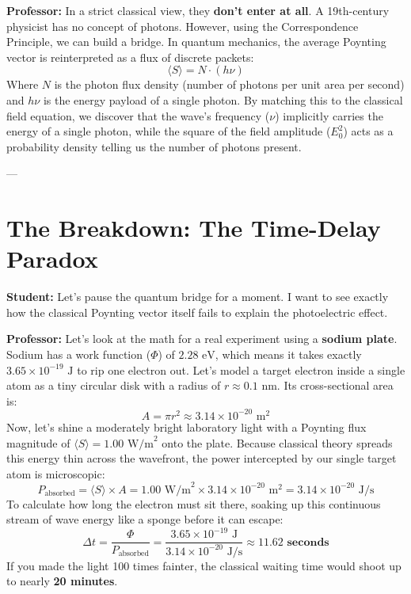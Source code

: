 \documentclass[11pt,a4paper]{article}
\newcommand{\Professor}{\noindent\textbf{\textcolor{profcolor}{Professor:}} }
\newcommand{\Student}{\noindent\textbf{\textcolor{studcolor}{Student:}} }
\begin{document}
	\Professor In a strict classical view, they \textbf{don't enter at all}. A 19th-century physicist has no concept of photons. However, using the Correspondence Principle, we can build a bridge. In quantum mechanics, the average Poynting vector is reinterpreted as a flux of discrete packets:
	\begin{equation}
		\langle S \rangle = N \cdot (h\nu)
	\end{equation}
	Where $N$ is the photon flux density (number of photons per unit area per second) and $h\nu$ is the energy payload of a single photon. By matching this to the classical field equation, we discover that the wave's frequency ($\nu$) implicitly carries the energy of a single photon, while the square of the field amplitude ($E_0^2$) acts as a probability density telling us the number of photons present.
	
	---
	
	\section{The Breakdown: The Time-Delay Paradox}
	
	\Student Let's pause the quantum bridge for a moment. I want to see exactly how the classical Poynting vector itself fails to explain the photoelectric effect. 
	
	\Professor Let's look at the math for a real experiment using a \textbf{sodium plate}. 
	Sodium has a work function ($\Phi$) of $2.28 \text{ eV}$, which means it takes exactly $3.65 \times 10^{-19} \text{ J}$ to rip one electron out. Let's model a target electron inside a single atom as a tiny circular disk with a radius of $r \approx 0.1 \text{ nm}$. Its cross-sectional area is:
	\begin{equation}
		A = \pi r^2 \approx 3.14 \times 10^{-20} \text{ m}^2
	\end{equation}
	Now, let's shine a moderately bright laboratory light with a Poynting flux magnitude of $\langle S \rangle = 1.00 \text{ W/m}^2$ onto the plate. Because classical theory spreads this energy thin across the wavefront, the power intercepted by our single target atom is microscopic:
	\begin{equation}
		P_{\text{absorbed}} = \langle S \rangle \times A = 1.00 \text{ W/m}^2 \times 3.14 \times 10^{-20} \text{ m}^2 = 3.14 \times 10^{-20} \text{ J/s}
	\end{equation}
	To calculate how long the electron must sit there, soaking up this continuous stream of wave energy like a sponge before it can escape:
	\begin{equation}
		\Delta t = \frac{\Phi}{P_{\text{absorbed}}} = \frac{3.65 \times 10^{-19} \text{ J}}{3.14 \times 10^{-20} \text{ J/s}} \approx \mathbf{11.62 \text{ seconds}}
	\end{equation}
	If you made the light 100 times fainter, the classical waiting time would shoot up to nearly \textbf{20 minutes}. 
	
\end{document}
